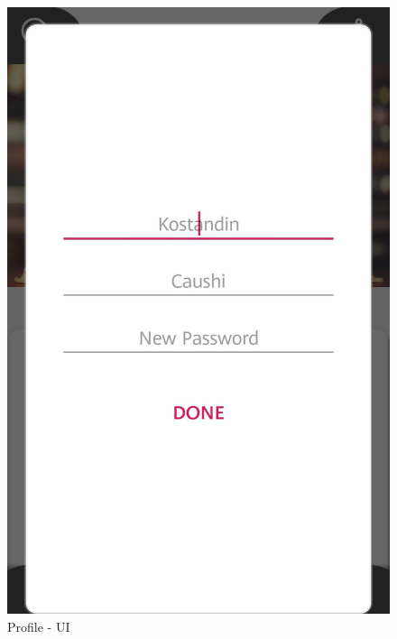 \begin{figure}[H]
	\includegraphics[scale=0.15]{Images/UI/Profile/3}
	\caption{Profile - UI}
\end{figure}

